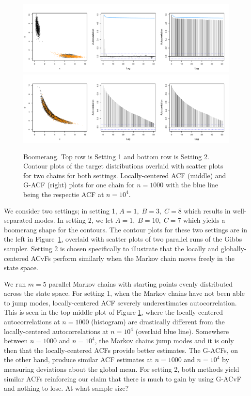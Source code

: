 \documentclass[11pt]{article}
\theoremstyle{remark}
\begin{document}
\begin{figure}[htbp]
    \centering
    \includegraphics[width = .75\textwidth]{plots/boom-all_1_3_8.pdf}\\
    \includegraphics[width = .75\textwidth]{plots/boom-all_1_10_7.pdf}    

    \caption{Boomerang. Top row is Setting 1 and bottom row is Setting 2. Contour plots of the target distributions  overlaid with scatter plots for two chains for both settings.  Locally-centered ACF (middle) and G-ACF (right) plots for one chain for $n = 1000$ with the blue line being the respectie ACF at $n = 10^4$.  }
   \label{fig:boom-2D}
\end{figure}

We consider two settings; in setting 1,
$A = 1,\; B = 3,\; C = 8$ which results in well-separated modes. In setting 2, we let $A = 1, \; B = 10, \; C=7$ which yields a boomerang shape for the contours. The contour plots for these two settings are in the left in Figure~\ref{fig:boom-2D}, overlaid with scatter plots of two parallel runs of the Gibbs sampler. Setting 2 is chosen specifically to illustrate that the locally and globally-centered ACvFs perform similarly when the Markov chain moves freely in the state space. 

We run $m=5$ parallel Markov chains with starting points evenly distributed across the state space. For setting 1, when the Markov chains have not been able to jump modes, locally-centered ACF severely underestimates autocorrelation. This is seen in the top-middle plot of Figure \ref{fig:boom-2D}, where the locally-centered autocorrelations at $n=1000$ (histogram) are drastically different from the locally-centered autocorrelations at $n = 10^4$ (overlaid blue line). Somewhere between $n = 1000$ and $n = 10^4$, the Markov chains jump modes and it is only then that the locally-centered ACFs provide better estimates. The G-ACFs,  on the other hand, produce similar ACF estimates at $n = 1000$ and $n = 10^4$ by measuring deviations about the global mean. For setting 2, both methods yield similar ACFs  reinforcing our claim that there is much to gain by using G-ACvF and nothing to lose.
{\color{orange} At what sample size?}
\end{document}
